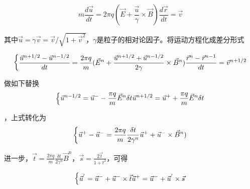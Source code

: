 {\begin{equation}
m \frac{d \vec{u}}{dt}=2 \pi q (\vec{E} + \frac{\vec{u}}{\gamma} \times \vec{B})
\frac{d \vec{r}}{dt}= \vec{v}

\end{equation} 


其中$\vec{u}=\gamma \vec{v} = \vec{v}/\sqrt{1+ {\vec{v}}^2}$，$\gamma$是粒子的相对论因子。将运动方程化成差分形式


\begin{equation}
\label{eqn:PIC_motion_derivative}
\begin{dcases*}

\frac{\vec{u}^{n+1/2}-\vec{u}^{n-1/2}}{dt}=\frac{2 \pi q }{m} (\vec{E}^n + \frac{\vec{u}^{n+1/2}+\vec{u}^{n-1/2}}{2\gamma} \times \vec{B}^n)
\frac{\vec{r}^{n}-\vec{r}^{n-1}}{dt}= \vec{v}^{n+1/2}

\end{dcases*}
\end{equation} 


做如下替换
\begin{equation}
\label{eqn:PIC_half_acceleration}
\begin{dcases*}

\vec{u}^{n-1/2} = \vec{u}^{-}- \frac{\pi q }{m} \vec{E}^n \delta t
\vec{u}^{n+1/2} = \vec{u}^{+} +\frac{\pi q }{m} \vec{E}^n \delta t

\end{dcases*}
\end{equation} 

，上式转化为
\begin{equation}
\label{eqn:PIC_half_acceleration}
\begin{dcases*}

{\vec{u}^{+}-\vec{u}^{-}}=\frac{2 \pi q }{m} \frac{{\delta} t}{2 {\gamma}^n} {\vec{u}^{+} + \vec{u}^{-}} \times \vec{B}^n)
\end{dcases*}
\end{equation} 


进一步，$\vec{t}= \frac{2 \pi q}{m} \frac{{\delta} t}{2 {\gamma}^n} \vec{B}^n$，$\vec{s}=\frac{2\vec{t}}{1+t^2}$，可得


\begin{equation}
\label{eqn:PIC_half_acceleration1}
\begin{dcases*}

\vec{u}^{'}=\vec{u}^{-} + \vec{u}^{-} \times \vec{t}
\vec{u}^{+}=\vec{u}^{-} + \vec{u}^{'} \times \vec{s}

\end{dcases*}
\end{equation} 




}
